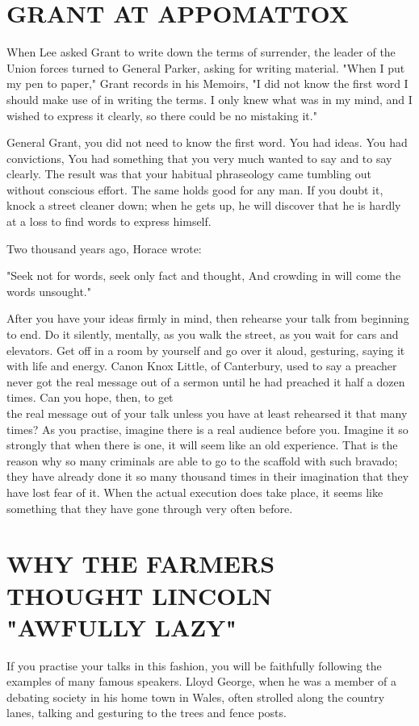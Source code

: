 \documentclass[10pt]{article}
\begin{document}
\section*{GRANT AT APPOMATTOX}
When Lee asked Grant to write down the terms of surrender, the leader of the Union forces turned to General Parker, asking for writing material. "When I put my pen to paper," Grant records in his Memoirs, "I did not know the first word I should make use of in writing the terms. I only knew what was in my mind, and I wished to express it clearly, so there could be no mistaking it."

General Grant, you did not need to know the first word. You had ideas. You had convictions, You had something that you very much wanted to say and to say clearly. The result was that your habitual phraseology came tumbling out without conscious effort. The same holds good for any man. If you doubt it, knock a street cleaner down; when he gets up, he will discover that he is hardly at a loss to find words to express himself.

Two thousand years ago, Horace wrote:

\begin{displayquote}
"Seek not for words, seek only fact and thought, And crowding in will come the words unsought."
\end{displayquote}

After you have your ideas firmly in mind, then rehearse your talk from beginning to end. Do it silently, mentally, as you walk the street, as you wait for cars and elevators. Get off in a room by yourself and go over it aloud, gesturing, saying it with life and energy. Canon Knox Little, of Canterbury, used to say a preacher never got the real message out of a sermon until he had preached it half a dozen times. Can you hope, then, to get\\
the real message out of your talk unless you have at least rehearsed it that many times? As you practise, imagine there is a real audience before you. Imagine it so strongly that when there is one, it will seem like an old experience. That is the reason why so many criminals are able to go to the scaffold with such bravado; they have already done it so many thousand times in their imagination that they have lost fear of it. When the actual execution does take place, it seems like something that they have gone through very often before.

\section*{WHY THE FARMERS THOUGHT LINCOLN "AWFULLY LAZY"}
If you practise your talks in this fashion, you will be faithfully following the examples of many famous speakers. Lloyd George, when he was a member of a debating society in his home town in Wales, often strolled along the country lanes, talking and gesturing to the trees and fence posts.
\end{document}
